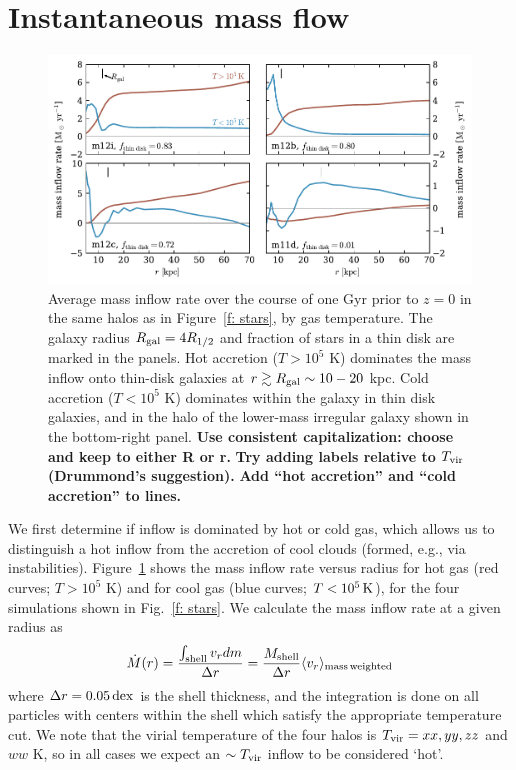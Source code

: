 \documentclass[fleqn,usenatbib]{mnras}
\newcommand{\Mdot}{\dot{M}}
\newcommand{\Tvir}{T_{\rm vir}}
\begin{document}
\section{Instantaneous mass flow}
\label{s: appendix-mass flow}

\begin{figure}
    \centering
    \includegraphics{figures/Mdot.pdf}
    \caption{
    Average mass inflow rate over the course of one Gyr prior to $z=0$ in the same halos as in Figure~\ref{f: stars}, by gas temperature.
    The galaxy radius $R_{\rm gal}=4 R_{1/2}$ and fraction of stars in a thin disk are marked in the panels. 
    Hot accretion ($T>10^5$ K) dominates the mass inflow onto thin-disk galaxies at $r \gtrsim R_{\rm gal} \sim 10-20$ kpc.
    Cold accretion ($T<10^5$ K) dominates within the galaxy in thin disk galaxies, and in the halo of the lower-mass irregular galaxy shown in the bottom-right panel.
    \textbf{Use consistent capitalization: choose and keep to either R or r.}
    \textbf{Try adding labels relative to $T_{\rm vir}$ (Drummond's suggestion).}
    \textbf{Add ``hot accretion'' and ``cold accretion'' to lines.}
    }
    \label{f: Mdot}
\end{figure}

We first determine if inflow is dominated by hot or cold gas, which allows us to distinguish a hot inflow from the accretion of cool clouds (formed, e.g., via instabilities).
Figure~\ref{f: Mdot} shows the mass inflow rate versus radius for hot gas (red curves; $T>10^5$ K) and for cool gas (blue curves; $T < 10^5\,{\rm K}$),  for the four simulations shown in Fig.~\ref{f: stars}. 
We calculate the mass inflow rate at a given radius as
\begin{equation}
     \Mdot(r) = \frac{\int_{\rm shell} v_r dm}{\Delta r} = \frac{M_{\rm shell}}{\Delta r} \langle v_r\rangle_{\rm mass\, weighted}
     \label{e: Mdot}
\end{equation}
where $\Delta r=0.05\,{\rm dex}$ is the shell thickness, and the integration is done on all particles with centers within the shell which satisfy the appropriate temperature cut. 
We note that the virial temperature of the four halos is $\Tvir = xx, yy, zz$ and $ww$ K, so in all cases we expect an $\sim\Tvir$ inflow  to be considered `hot'. 
\end{document}
